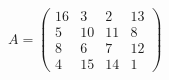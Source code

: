 \documentclass[12pt]{article}
\begin{document}
$ \begin{equation*}    A =     \begin{pmatrix}    16 & 3 & 2 & 13 \\    5 & 10 & 11 & 8 \\    8  & 6  & 7 & 12  \\    4 & 15 & 14 & 1     \end{pmatrix}    \end{equation*} $
\end{document}
